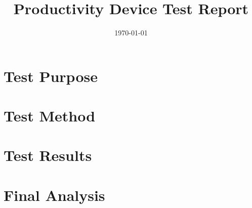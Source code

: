 \documentclass{article}
\title{Productivity Device Test Report}
\author{}
\date{\today}
\begin{document}
\maketitle

\section{Test Purpose}

\section{Test Method}
\begin{enum}
    \item %
\end{enum}

\section{Test Results}

\section{Final Analysis}
\end{document}
